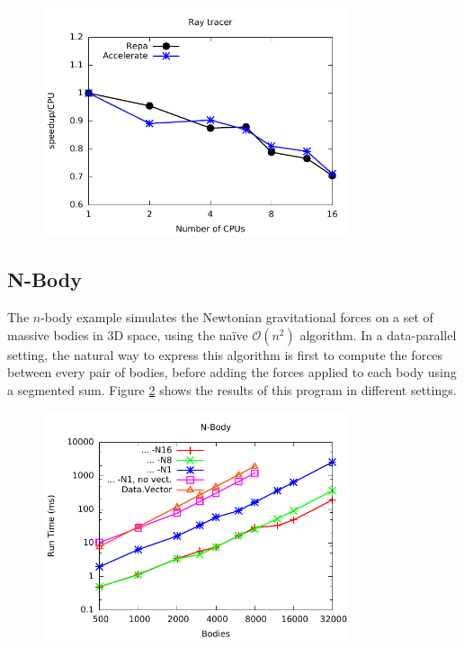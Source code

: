 \documentclass[a4paper,bibliography=totocnumbered,parskip,headsepline]{scrbook}
\begin{document}
\begin{figure}
    \centering
    \includegraphics[width=0.8\textwidth]{images/benchmarks/ray/ray-scale}
    \label{fig:ray_scale}
\end{figure}

\subsection{N-Body}
The $n$-body example simulates the Newtonian gravitational forces on a set of massive bodies in 3D space, using the na\"ive $\mathcal{O}\left( n^{2} \right)$ algorithm.
In a data-parallel setting, the natural way to express this algorithm is first to compute the forces between every pair of bodies, before adding the forces applied to each body using a segmented sum.
Figure \ref{fig:nbody} shows the results of this program in different settings.

\begin{figure}
    \centering
    \includegraphics[width=0.8\textwidth]{images/benchmarks/nbody/nbody}
    \label{fig:nbody}
\end{figure}
\end{document}
